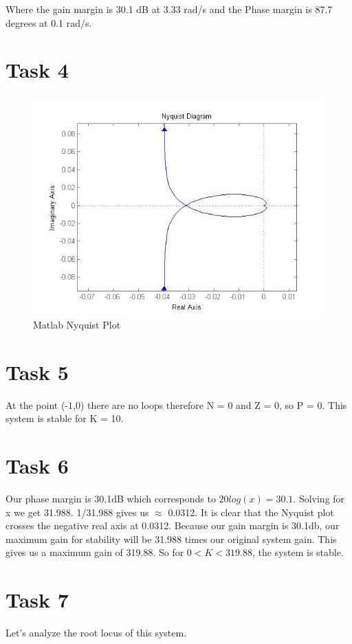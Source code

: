 \documentclass[12pt,letter]{article}
\begin{document}
\noindent Where the gain margin is 30.1 dB at 3.33 rad/s and the Phase margin is 87.7 degrees at 0.1 rad/s.
\section*{Task 4}
\begin{figure}[H]
\centering
\includegraphics[width=1\linewidth]{Task4}
\caption{Matlab Nyquist Plot}
\label{fig:Task4}
\end{figure}


\section*{Task 5}
At the point (-1,0) there are no loops therefore N = 0 and Z = 0, so P = 0. This system is stable for K = 10.

\section*{Task 6}
Our phase margin is 30.1dB which corresponds to $20log(x)=30.1$. Solving for x we get 31.988. 1/31.988 gives us $\approx$ 0.0312. It is clear that the Nyquist plot crosses the negative real axis at 0.0312. Because our gain margin is 30.1db, our maximum gain for stability will be 31.988 times our original system gain. This gives us a maximum gain of 319.88. So for $0< K < 319.88$, the system is stable.
\section*{Task 7}
Let's analyze the root locus of this system.
\end{document}
